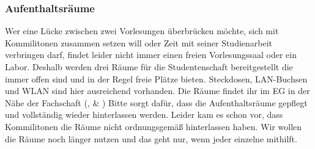 \subsubsection{Aufenthaltsräume}
Wer eine Lücke zwischen zwei Vorlesungen überbrücken möchte, sich mit Kommilitonen
zusammen setzen will oder Zeit mit seiner Studienarbeit verbringen darf, findet leider nicht
immer einen freien Vorlesungssaal oder ein Labor. 
Deshalb werden drei Räume für die Studentenschaft bereitgestellt die 
immer offen sind und in der Regel freie Plätze bieten. Steckdosen, LAN-Buchsen und WLAN sind hier ausreichend vorhanden. Die Räume findet 
ihr im EG in der Nähe der Fachschaft (,  \& )
Bitte sorgt dafür, dass die Aufenthaltsräume gepflegt und vollständig wieder hinterlassen werden.
Leider kam es schon vor, dass Kommilitonen die Räume nicht ordnungsgemäß hinterlassen haben.
Wir wollen die Räume noch länger nutzen und das geht nur, wenn jeder einzelne mithilft.